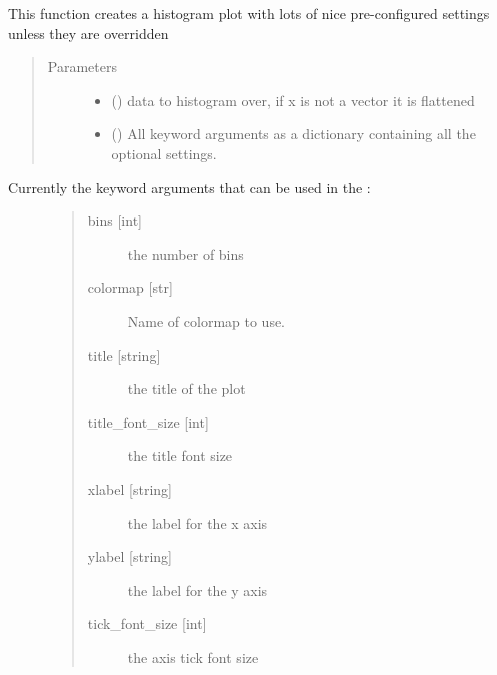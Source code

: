 \documentclass[letterpaper,10pt,english]{sphinxmanual}
\begin{document}
\begin{fulllineitems}
\label{\detokenize{modules/dpt_tools:dpt_tools.hist2d}}
This function creates a histogram plot with lots of nice pre-configured settings unless they are overridden
\begin{quote}\begin{description}
\item[{Parameters}] \leavevmode\begin{itemize}
\item {} 
 () \textendash{} data to histogram over, if x is not a vector it is flattened

\item {} 
 () \textendash{} All keyword arguments as a dictionary containing all the optional settings.

\end{itemize}

\end{description}\end{quote}
\begin{description}
\item[{Currently the keyword arguments that can be used in the :}] \leavevmode\begin{quote}\begin{description}
\item[{bins {[}int{]}}] \leavevmode
the number of bins

\item[{colormap {[}str{]}}] \leavevmode
Name of colormap to use.

\item[{title {[}string{]}}] \leavevmode
the title of the plot

\item[{title\_font\_size {[}int{]}}] \leavevmode
the title font size

\item[{xlabel {[}string{]}}] \leavevmode
the label for the x axis

\item[{ylabel {[}string{]}}] \leavevmode
the label for the y axis

\item[{tick\_font\_size {[}int{]}}] \leavevmode
the axis tick font size


\end{description}
\end{quote}
\end{description}
\end{fulllineitems}
\end{document}
